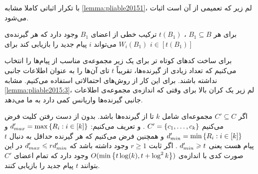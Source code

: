با تکرار اثباتی کاملا مشابه
\autoref{lemma:pliable20151}، لم زیر که تعمیمی از آن است اثبات می‌شود.
\begin{lemma}
    برای هر
    $B_1 \subseteq B$
    ،
    $t(B_1)$
    ترکیب خطی از اعضای
    $B_1$
    وجود دارد که هر گیرنده‌ی
    $W_i(B_1)$
    می‌تواند
    $i$
    پیام جدید را بازیابی کند برای
    $i \in [t(B_1)]$
\end{lemma}
برای ساخت کدهای کوتاه تر برای
یک زیر مجموعه‌ی مناسب از پیام‌ها را انتخاب می‌کنیم که تعداد زیادی از گیرنده‌ها، تقریباً
$t$
تای آن‌ها را به عنوان اطلاعات جانبی نداشته باشند. برای این کار از روش‌های احتمالاتی استفاده می‌کنیم. مشابه
\autoref{lemma:pliable2015:3}، لم زیر یک کران بالا برای وقتی که اندازه‌ی مجموعه‌ی اطلاعات جانبی گیرنده‌ها واریانس کمی دارد به ما می‌دهد.
\begin{lemma}
    \label{lemma:pliable2015:6}
    اگر
    $C' \subseteq C$
    مجموعه‌ای شامل
    $k$
    تا از گیرنده‌‌ها باشد. بدون از دست رفتن کلیت فرض می‌کنیم
    $C' = \left\{ c_1, \ldots, c_k \right\}$
    . و تعریف می‌کنیم:
    $d_{max}' = \max\left\{ R_i: i \in [k]  \right\}$
    و
    $d_{min}' = \min\left\{ R_i: i \in [k]  \right\}$
    و همچنین فرض می‌کنیم که هر گیرنده حداقل به دنبال
    $t$
    پیام هست یعنی
    $d_{min}' \geqslant t$
    . اگر ثابت
    $r \geq 1$
    وجود داشته باشد که
    $d_{max}' \leqslant r d_{min}'$
    در این صورت کدی با اندازه‌ی
    $O(\min\left\{ t \log(k), t + \log^2 k \right\})$
    وجود دارد که تمام اعضای
    $C'$
    بتوانند
    $t$
    پیام جدید را بازیابی کنند.
\end{lemma}

